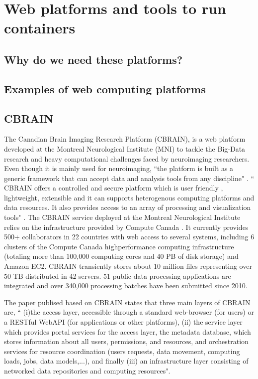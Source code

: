 \section{Web platforms and tools to run containers}
\subsection{Why do we need these platforms?}
\subsection{Examples of web computing platforms}
\subsection{CBRAIN}
The Canadian Brain Imaging Research Platform (CBRAIN), is a web platform developed at the Montreal Neurological Institute (MNI) to tackle the Big-Data research and heavy computational challenges faced by neuroimaging researchers. Even though it is mainly used for neuroimaging, ``the platform is built as a generic framework that can accept data and analysis tools from any discipline" \cite{DBLP:journals/fini/DasGRSPMSRSKMKR17}. `` CBRAIN offers a controlled and secure platform which is user friendly , lightweight, extensible and it can supports heterogenous computing platforms and data resources. It also provides access to an array of processing and visualization tools" . The CBRAIN service deployed at the Montreal Neurological Institute relies on the infrastructure provided by Compute Canada \cite{DAS20161188}. It currently provides 500+ collaborators in 22 countries with web access to several systems, including 6 clusters of the Compute Canada highperformance computing infrastructure (totaling more than 100,000 computing cores and 40 PB of disk storage) and Amazon EC2. CBRAIN transiently stores about 10 million files representing over 50 TB distributed in 42 servers. 51 public data processing applications are integrated and over 340,000 processing batches have been submitted since 2010.

The paper publised based on CBRAIN \cite{DBLP:journals/fini/DasGRSPMSRSKMKR17} states that three main layers of CBRAIN are, `` (i)the access layer, accessible through a standard web-browser (for users) or a RESTful WebAPI (for applications or other platforms), (ii) the service layer which provides portal services for the access layer, the metadata database, which stores information about all users, permissions, and resources, and orchestration services for resource coordination (users requests, data movement, computing loads, jobs, data models,...), and finally (iii) an infrastructure layer consisting of networked data repositories and computing resources".


